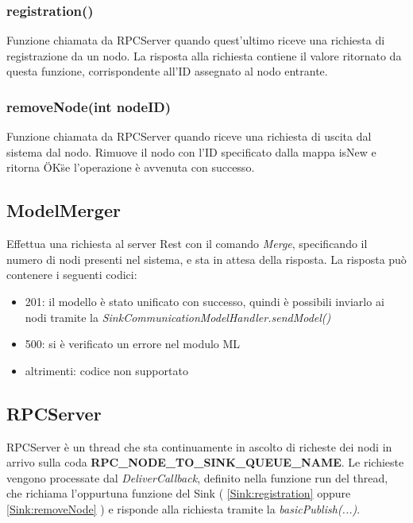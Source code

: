       \subsubsection{registration()}
        Funzione chiamata da RPCServer quando quest'ultimo riceve una richiesta di registrazione da un nodo. La risposta alla richiesta contiene il valore ritornato da questa funzione, corrispondente all'ID assegnato al nodo entrante.
        

      \subsubsection{removeNode(int nodeID)}
        Funzione chiamata da RPCServer quando riceve una richiesta di uscita dal sistema dal nodo. Rimuove il nodo con l'ID specificato dalla mappa isNew e ritorna \"OK\" se l'operazione è avvenuta con successo.
        

    \subsection{ModelMerger}\label{ModelMerger}
      Effettua una richiesta al server Rest con il comando \textit{Merge}, specificando il numero di nodi presenti nel sistema, e sta in attesa della risposta. La risposta può contenere i seguenti codici:
      \begin{itemize}
        \item 201: il modello è stato unificato con successo, quindi è possibili inviarlo ai nodi tramite la \textit{SinkCommunicationModelHandler.sendModel()}
        \item 500: si è verificato un errore nel modulo ML
        \item altrimenti: codice non supportato
      \end{itemize}
      

    \subsection{RPCServer}
      RPCServer è un thread che sta continuamente in ascolto di richeste dei nodi in arrivo sulla coda \textbf{RPC\_NODE\_TO\_SINK\_QUEUE\_NAME}. Le richieste vengono processate dal \textit{DeliverCallback}, definito nella funzione run del thread, che richiama l'oppurtuna funzione del Sink ( \ref{Sink:registration} oppure \ref{Sink:removeNode} ) e risponde alla richiesta tramite la \textit{basicPublish(...)}.
      

